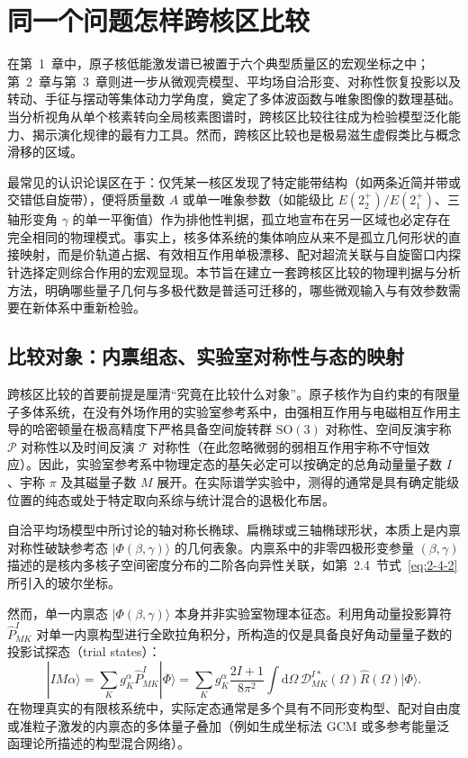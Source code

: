 \section{同一个问题怎样跨核区比较}\label{sec:4-1}

在第~1~章中，原子核低能激发谱已被置于六个典型质量区的宏观坐标之中；第~2~章与第~3~章则进一步从微观壳模型、平均场自洽形变、对称性恢复投影以及转动、手征与摆动等集体动力学角度，奠定了多体波函数与唯象图像的数理基础。当分析视角从单个核素转向全局核素图谱时，跨核区比较往往成为检验模型泛化能力、揭示演化规律的最有力工具。然而，跨核区比较也是极易滋生虚假类比与概念滑移的区域。

最常见的认识论误区在于：仅凭某一核区发现了特定能带结构（如两条近简并带或交错低自旋带），便将质量数 $A$ 或单一唯象参数（如能级比 $E(2^+_2)/E(2^+_1)$、三轴形变角 $\gamma$ 的单一平衡值）作为排他性判据，孤立地宣布在另一区域也必定存在完全相同的物理模式。事实上，核多体系统的集体响应从来不是孤立几何形状的直接映射，而是价轨道占据、有效相互作用单极漂移、配对超流关联与自旋窗口内探针选择定则综合作用的宏观显现。本节旨在建立一套跨核区比较的物理判据与分析方法，明确哪些量子几何与多极代数是普适可迁移的，哪些微观输入与有效参数需要在新体系中重新检验。

\subsection{比较对象：内禀组态、实验室对称性与态的映射}\label{sec:4-1-1}

跨核区比较的首要前提是厘清``究竟在比较什么对象''。原子核作为自约束的有限量子多体系统，在没有外场作用的实验室参考系中，由强相互作用与电磁相互作用主导的哈密顿量在极高精度下严格具备空间旋转群 $\mathrm{SO}(3)$ 对称性、空间反演宇称 $\mathcal{P}$ 对称性以及时间反演 $\mathcal{T}$ 对称性（在此忽略微弱的弱相互作用宇称不守恒效应）。因此，实验室参考系中物理定态的基矢必定可以按确定的总角动量量子数 $I$、宇称 $\pi$ 及其磁量子数 $M$ 展开。在实际谱学实验中，测得的通常是具有确定能级位置的纯态或处于特定取向系综与统计混合的退极化布居。

自洽平均场模型中所讨论的轴对称长椭球、扁椭球或三轴椭球形状，本质上是内禀对称性破缺参考态 $|\Phi(\beta,\gamma)\rangle$ 的几何表象。内禀系中的非零四极形变参量 $(\beta, \gamma)$ 描述的是核内多核子空间密度分布的二阶各向异性关联，如第~2.4~节式~\eqref{eq:2-4-2}所引入的玻尔坐标。

然而，单一内禀态 $|\Phi(\beta,\gamma)\rangle$ 本身并非实验室物理本征态。利用角动量投影算符 $\hat{P}^I_{MK}$ 对单一内禀构型进行全欧拉角积分，所构造的仅是具备良好角动量量子数的投影试探态（trial states）：
\begin{equation}\label{eq:4-1-projection}
|IM\alpha\rangle = \sum_K g_K^\alpha \hat{P}^I_{MK} |\Phi\rangle = \sum_K g_K^\alpha \frac{2I+1}{8\pi^2} \int \mathrm{d}\Omega \, \mathcal{D}^{I*}_{MK}(\Omega) \hat{R}(\Omega) |\Phi\rangle.
\end{equation}
在物理真实的有限核系统中，实际定态通常是多个具有不同形变构型、配对自由度或准粒子激发的内禀态的多体量子叠加（例如生成坐标法 GCM 或多参考能量泛函理论所描述的构型混合网络）。

